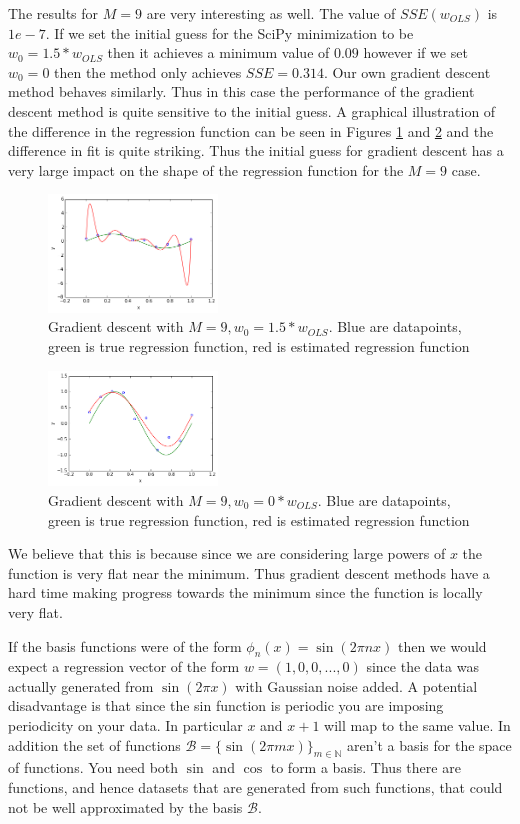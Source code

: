 \documentclass[10pt]{article}
\begin{document}
The results for $M = 9$ are very interesting as well. The value of $SSE(w_{OLS})$ is $1e-7$. If we set the initial guess for the SciPy minimization to be $w_0 = 1.5*w_{OLS}$ then it achieves a minimum value of $0.09$ however if we set $w_0 = 0$ then the method only achieves $SSE = 0.314$. Our own gradient descent method behaves similarly. Thus in this case the performance of the gradient descent method is quite sensitive to the initial guess. A graphical illustration of the difference in the regression function can be seen in Figures \ref{m_9_grad_descent_good} and \ref{m_9_grad_descent_bad} and the difference in fit is quite striking. Thus the initial guess for gradient descent has a very large impact on the shape of the regression function for the $M = 9$ case.
%
\begin{figure}[h]
\centering
\includegraphics[width=0.4\textwidth]{m_9_grad_descent_good}
\caption{Gradient descent with $M = 9, w_0 = 1.5*w_{OLS}$. Blue are datapoints, green is true regression function, red is estimated regression function}
\label{m_9_grad_descent_good}
\end{figure}
\begin{figure}[h]
\centering
\includegraphics[width=0.4\textwidth]{m_9_grad_descent_bad}
\caption{Gradient descent with $M = 9, w_0 = 0*w_{OLS}$. Blue are datapoints, green is true regression function, red is estimated regression function}
\label{m_9_grad_descent_bad}
\end{figure}
%
%
We believe that this is because since we are considering large powers of $x$ the function is very flat near the minimum. Thus gradient descent methods have a hard time making progress towards the minimum since the function is locally very flat. 

If the basis functions were of the form $\phi_n(x)=\sin(2\pi n x)$ then we would expect a regression vector of the form $w = (1,0,0,...,0)$ since the data was actually generated from $\sin(2 \pi x)$ with Gaussian noise added. A potential disadvantage is that since the sin function is periodic you are imposing periodicity on your data. In particular $x $ and $x+1$ will map to the same value. In addition the set of functions $\mathcal{B} = \{\sin(2 \pi m x)\}_{m \in \mathbb{N}}$ aren't a basis for the space of functions. You need both $\sin$ and $\cos$ to form a basis. Thus there are functions, and hence datasets that are generated from such functions, that could not be well approximated by the basis $\mathcal{B}$.
\end{document}
